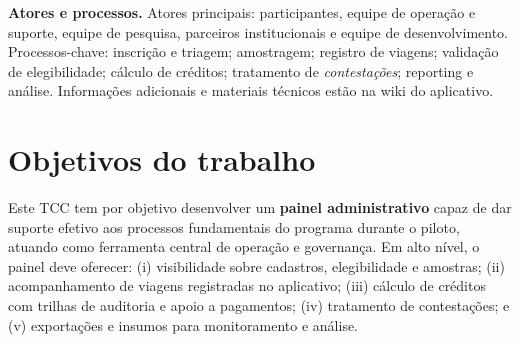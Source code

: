 \textbf{Atores e processos.} Atores principais: participantes, equipe de
operação e suporte, equipe de pesquisa, parceiros institucionais e equipe de
desenvolvimento. Processos-chave: inscrição e triagem; amostragem; registro de
viagens; validação de elegibilidade; cálculo de créditos; tratamento de
\emph{contestações}; reporting e análise. Informações adicionais e materiais
técnicos estão na wiki do aplicativo\citep{bikesp:wiki}.

\section{Objetivos do trabalho}
Este TCC tem por objetivo desenvolver um \textbf{painel administrativo} capaz
de dar suporte efetivo aos processos fundamentais do programa durante o piloto,
atuando como ferramenta central de operação e governança. Em alto nível, o
painel deve oferecer: (i) visibilidade sobre cadastros, elegibilidade e
amostras; (ii) acompanhamento de viagens registradas no aplicativo; (iii)
cálculo de créditos com trilhas de auditoria e apoio a pagamentos; (iv)
tratamento de contestações; e (v) exportações e insumos para monitoramento e
análise.


